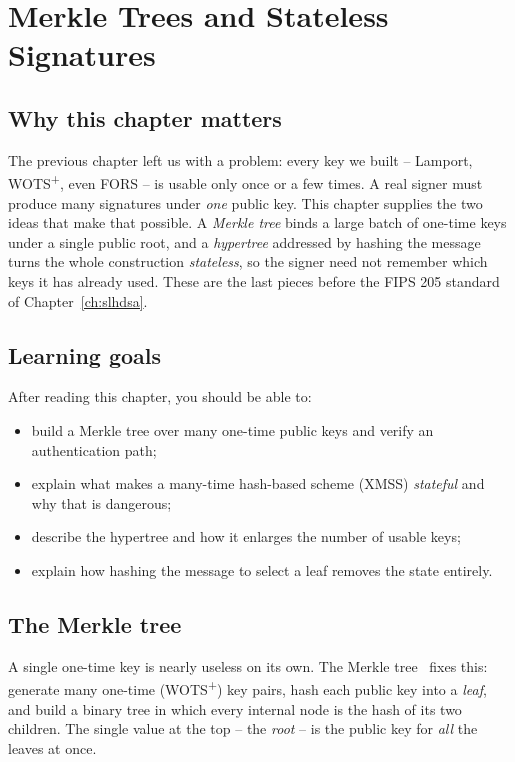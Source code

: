 \chapter{Merkle Trees and Stateless Signatures}
\label{ch:hashmerkle}

\section{Why this chapter matters}
The previous chapter left us with a problem: every key we built -- Lamport, WOTS\textsuperscript{+}, even FORS -- is usable only once or a few times. A real signer must produce many signatures under \emph{one} public key. This chapter supplies the two ideas that make that possible. A \emph{Merkle tree} binds a large batch of one-time keys under a single public root, and a \emph{hypertree} addressed by hashing the message turns the whole construction \emph{stateless}, so the signer need not remember which keys it has already used. These are the last pieces before the FIPS 205 standard of Chapter~\ref{ch:slhdsa}.

\section{Learning goals}
After reading this chapter, you should be able to:

\begin{itemize}
  \item build a Merkle tree over many one-time public keys and verify an authentication path;
  \item explain what makes a many-time hash-based scheme (XMSS) \emph{stateful} and why that is dangerous;
  \item describe the hypertree and how it enlarges the number of usable keys;
  \item explain how hashing the message to select a leaf removes the state entirely.
\end{itemize}

\section{The Merkle tree}
A single one-time key is nearly useless on its own. The Merkle tree~\cite{merkle1987} fixes this: generate many one-time (WOTS\textsuperscript{+}) key pairs, hash each public key into a \emph{leaf}, and build a binary tree in which every internal node is the hash of its two children. The single value at the top -- the \emph{root} -- is the public key for \emph{all} the leaves at once.

